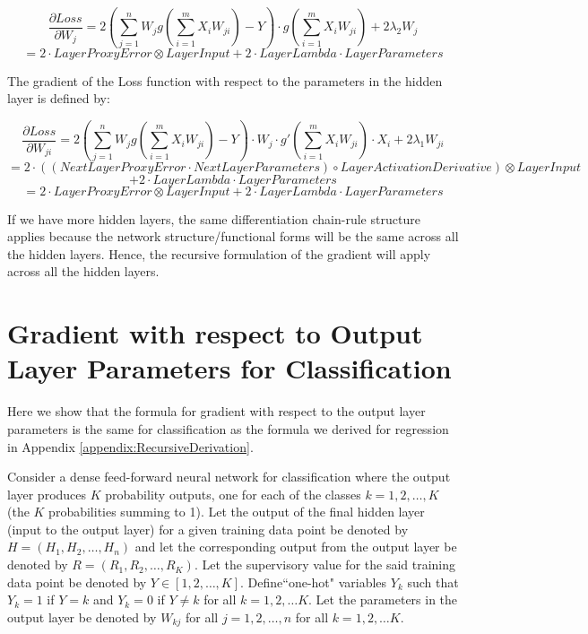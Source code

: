 \documentclass[10pt]{amsart}
\begin{document}
\begin{appendices}
$$\frac {\partial Loss}{\partial W_j} = 2 (\sum_{j=1}^n W_j g(\sum_{i=1}^m X_i W_{ji}) - Y) \cdot g(\sum_{i=1}^m X_i W_{ji}) + 2 \lambda_2 W_j$$
$$ = 2 \cdot LayerProxyError \otimes LayerInput + 2 \cdot LayerLambda \cdot LayerParameters$$

The gradient of the Loss function with respect to the parameters in the hidden layer is defined by:

$$\frac {\partial Loss}{\partial W_{ji}} = 2 (\sum_{j=1}^n W_j g(\sum_{i=1}^m X_i W_{ji}) - Y) \cdot W_j \cdot g'(\sum_{i=1}^m X_i W_{ji}) \cdot X_i + 2 \lambda_1 W_{ji}$$
$$ = 2 \cdot ((NextLayerProxyError \cdot NextLayerParameters) \circ LayerActivationDerivative) \otimes LayerInput$$
$$ + 2 \cdot LayerLambda \cdot LayerParameters$$
$$ = 2 \cdot LayerProxyError \otimes LayerInput + 2 \cdot LayerLambda \cdot LayerParameters$$

If we have more hidden layers, the same differentiation chain-rule structure applies because the network structure/functional forms will be the same across all the hidden layers. Hence, the recursive formulation of the gradient will apply across all the hidden layers.

\vspace{5mm}

\section{Gradient with respect to Output Layer Parameters for Classification}
\label{appendix:ClassificationDerivation}

Here we show that the formula for gradient with respect to the output layer parameters is the same for classification as the formula we derived for regression in Appendix \ref{appendix:RecursiveDerivation}.

Consider a dense feed-forward neural network for classification where the output layer produces $K$ probability outputs, one for each of the classes $k = 1, 2, \ldots, K$ (the $K$ probabilities summing to 1). Let the output of the final hidden layer (input to the output layer) for a given training data point be denoted by $H = (H_1, H_2, \ldots, H_n)$ and let the corresponding output from the output layer be denoted by $R = (R_1, R_2, \ldots, R_K)$. Let the supervisory value for the said training data point be denoted by $Y \in [1, 2, \ldots, K]$. Define``one-hot" variables $Y_k$ such that $Y_k = 1$ if $Y = k$ and $Y_k = 0$ if $Y \neq k$ for all $k = 1, 2, \ldots K$. Let the parameters in the output layer be denoted by $W_{kj}$ for all $j = 1, 2, \ldots, n$ for all $k = 1, 2, \ldots K$.


\end{appendices}
\end{document}
